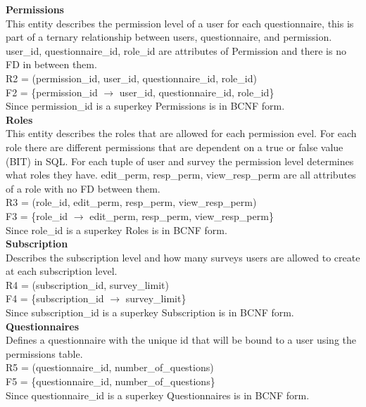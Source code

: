 \documentclass[12pt, oneside]{article}
\newcommand{\tb}[1]{\textbf{#1}}
\begin{document}
    \tb{Permissions} \\
    This entity describes the permission level of a user for each 
    questionnaire, this is part of a ternary relationship between users, questionnaire, and permission. user\_id, questionnaire\_id, role\_id are attributes of Permission and there is no FD in between them. \\
    R2 = (permission\_id, user\_id, questionnaire\_id, role\_id) \\
    F2 = \{permission\_id \(\rightarrow\) user\_id, questionnaire\_id, role\_id\} \\
    Since permission\_id is a superkey Permissions is in BCNF form. 
    \\
    
    \tb{Roles} \\
    This entity describes the roles that are allowed for each permission evel. For each role there are different permissions that are dependent on a true or false value (BIT) in SQL. For each tuple of user and survey the permission level determines what roles they have. edit\_perm, resp\_perm, view\_resp\_perm are all attributes of a role with no FD between them. \\
    R3 = (role\_id, edit\_perm, resp\_perm, view\_resp\_perm) \\
    F3 = \{role\_id \(\rightarrow\) edit\_perm, resp\_perm, view\_resp\_perm\} \\
    Since role\_id is a superkey Roles is in BCNF form. 
    \\

    \tb{Subscription} \\
    Describes the subscription level and how many surveys users are allowed to create at each subscription level. \\
    R4 = (subscription\_id, survey\_limit) \\
    F4 = \{subscription\_id \(\rightarrow\) survey\_limit\} \\
    Since subscription\_id is a superkey Subscription is in BCNF form. 
    \\

    \tb{Questionnaires} \\
    Defines a questionnaire with the unique id that will be bound to a user using the permissions table. \\
    R5 = (questionnaire\_id, number\_of\_questions) \\
    F5 = \{questionnaire\_id, number\_of\_questions\} \\ 
    Since questionnaire\_id is a superkey Questionnaires is in BCNF form. 
    \\
\end{document}
